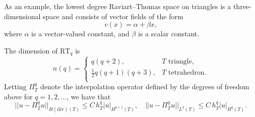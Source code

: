 As an example, the lowest degree Raviart--Thomas space on triangles is a
three-dimensional space and consists of vector fields of the form
\begin{equation}
  v(x) = \alpha + \beta x,
\end{equation}
where $\alpha$ is a vector-valued constant, and $\beta$ is a scalar
constant.

The dimension of $\mathrm{RT}_q$ is
\begin{equation}
  n(q) = \left \{
  \begin{array}{ll}
  q (q + 2), & T \text{ triangle}, \\
  \frac{1}{2} q (q + 1)(q + 3), & T \text{ tetrahedron}.\\
  \end{array}
  \right .
\end{equation}
Letting $\Pi_T^q$ denote the interpolation operator defined by the
degrees of freedom above for $q = 1, 2, \dots$, we have
that \citep[Chapter III.3]{BrezziFortin1991}
\begin{equation}
  ||u - \Pi_T^q u||_{H(\mathrm{div})(T)} \leqslant C \, h_T^{q} |u|_{H^{q+1}(T)}, \quad
  ||u - \Pi_T^q u||_{L^2(T)} \leqslant C \, h_T^{q} |u|_{H^{q}(T)}.
\end{equation}

